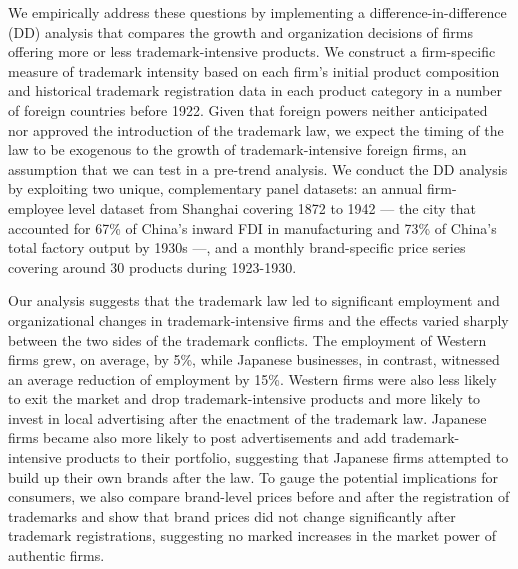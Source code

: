 \documentclass[12pt]{article}
\begin{document}
We empirically address these questions by implementing a difference-in-difference (DD) analysis that compares the growth and organization decisions of firms offering more or less trademark-intensive products. We construct a firm-specific measure of trademark intensity based on each firm's initial product composition and historical trademark registration data in each product category in a number of foreign countries before 1922. Given that foreign powers neither anticipated nor approved the introduction of the trademark law, we  expect the timing of the law to be exogenous to the growth of trademark-intensive foreign firms, an assumption that we can test in a pre-trend analysis. We conduct the DD analysis by exploiting two unique, complementary panel datasets: an annual firm-employee level dataset from Shanghai covering 1872 to 1942 --- the city that accounted for 67\% of China's inward FDI in manufacturing and 73\% of China's total factory output by 1930s ---, and a monthly brand-specific price series covering around 30 products during 1923-1930. 

Our analysis suggests that the trademark law led to significant employment and organizational changes in trademark-intensive firms and the effects varied sharply between the two sides of the trademark conflicts. The employment of Western firms grew, on average, by 5\%, while Japanese businesses, in contrast, witnessed an average reduction of employment by 15\%. Western firms were also less likely to exit the market and drop trademark-intensive products and more likely to invest in local advertising after the enactment of the trademark law. Japanese firms became also more likely to post advertisements and add trademark-intensive products to their portfolio, suggesting that Japanese firms attempted to build up their own brands after the law. %
To gauge the potential implications for consumers, we also compare brand-level prices before and after the registration of trademarks and show that brand prices did not change significantly after trademark registrations, suggesting no marked increases in the market power of authentic firms. 
\end{document}
